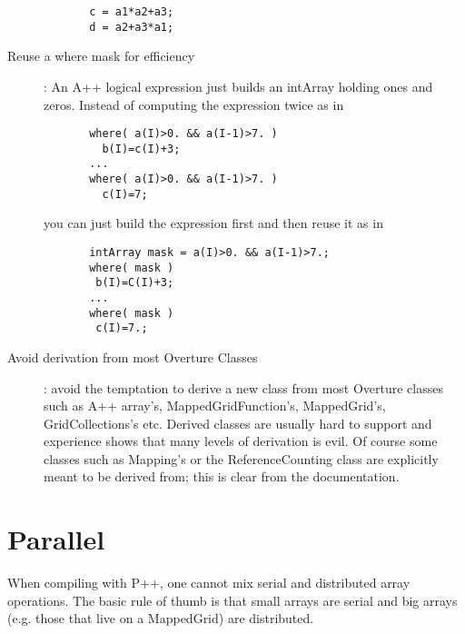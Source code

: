 \documentclass{article}
\begin{document}
\begin{description}
\begin{verbatim}
       c = a1*a2+a3;
       d = a2+a3*a1;
    \end{verbatim}
  \item[Reuse a where mask for efficiency]: 
    An A++ logical expression just builds an intArray holding ones and zeros. Instead of computing the
    expression twice as in
    \begin{verbatim}
       where( a(I)>0. && a(I-1)>7. )
         b(I)=c(I)+3;
       ...
       where( a(I)>0. && a(I-1)>7. )
         c(I)=7;
    \end{verbatim}
    you can just build the expression first and then reuse it as in
    \begin{verbatim}
       intArray mask = a(I)>0. && a(I-1)>7.;
       where( mask )
        b(I)=C(I)+3;
       ...
       where( mask )
        c(I)=7.;      
    \end{verbatim}
  \item[Avoid derivation from most Overture Classes] : avoid the temptation to derive a new class from
    most Overture classes such as A++ array's, MappedGridFunction's, MappedGrid's, GridCollections's etc. 
    Derived classes are usually hard to support and experience shows that many levels of derivation is
    evil. Of course some classes such as Mapping's or the ReferenceCounting class 
    are explicitly meant to be derived from; this is clear from the documentation.
\end{description}

\section{Parallel}

  When compiling with P++, one cannot mix serial and distributed
array operations. The basic rule of thumb is that small arrays are serial and big
arrays (e.g. those that live on a MappedGrid) are distributed.
\end{document}
